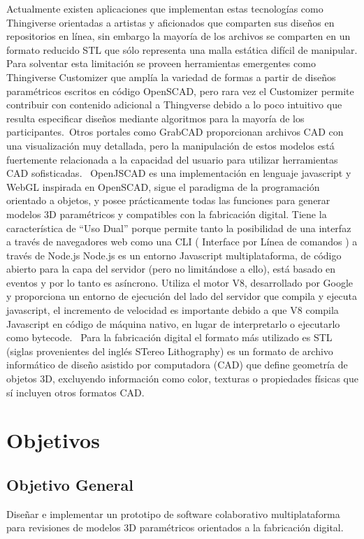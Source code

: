 Actualmente existen aplicaciones que implementan estas tecnologías como Thingiverse orientadas a artistas y aficionados que comparten sus diseños en repositorios en línea, sin embargo la mayoría de los archivos se comparten en un formato reducido STL que sólo representa una malla estática difícil de manipular. Para solventar esta limitación se proveen herramientas emergentes como Thingiverse Customizer que amplía la variedad de formas a partir de diseños paramétricos escritos en código OpenSCAD, pero rara vez el Customizer permite contribuir con contenido adicional a Thingverse debido a lo poco intuitivo que resulta especificar diseños mediante algoritmos para  la mayoría de los participantes.\
Otros portales como GrabCAD proporcionan archivos CAD con una visualización muy detallada, pero la manipulación de estos modelos está fuertemente relacionada a la capacidad del usuario para utilizar herramientas CAD sofisticadas. \
OpenJSCAD es una implementación en lenguaje javascript y WebGL inspirada en OpenSCAD, sigue el paradigma de la programación orientado a objetos, y posee prácticamente todas las funciones para generar modelos 3D paramétricos y compatibles con la fabricación digital. Tiene la característica de “Uso Dual” porque permite tanto la posibilidad de una interfaz a través de navegadores web como una CLI ( Interface por Línea de comandos ) a través de Node.js
Node.js es un entorno Javascript multiplataforma, de código abierto para la capa del servidor (pero no limitándose a ello), está basado en eventos y por lo tanto es asíncrono. Utiliza el motor V8, desarrollado por Google y proporciona un entorno de ejecución del lado del servidor que compila y ejecuta javascript, el incremento de velocidad es importante debido a que V8 compila Javascript en código de máquina nativo, en lugar de interpretarlo o ejecutarlo como bytecode. \
Para la fabricación digital el formato más utilizado es STL (siglas provenientes del inglés STereo Lithography) es un formato de archivo informático de diseño asistido por computadora (CAD) que define geometría de objetos 3D, excluyendo información como color, texturas o propiedades físicas que sí incluyen otros formatos CAD.\


\section{Objetivos}
\subsection {Objetivo General}
Diseñar e implementar un prototipo de software colaborativo multiplataforma para revisiones de modelos 3D paramétricos orientados a la fabricación digital.

